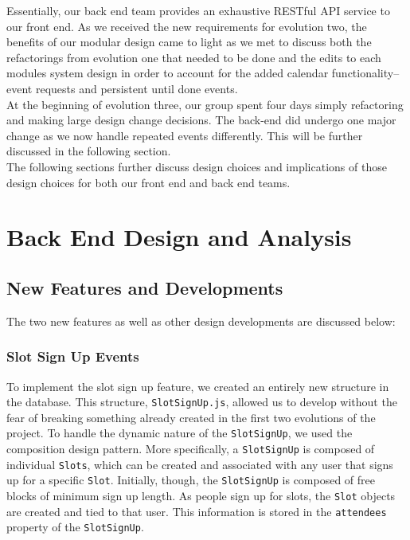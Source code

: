 \documentclass[11pt]{article}   %
\begin{document}
\noindent Essentially, our back end team provides an exhaustive RESTful API service to our front end. As we received the new requirements for evolution two, the benefits of our modular design came to light as we met to discuss both the refactorings from evolution one that needed to be done and the edits to each modules system design in order to account for the added calendar functionality--event requests and persistent until done events.\\

\noindent At the beginning of evolution three, our group spent four days simply refactoring and making large design change decisions. The back-end did undergo one major change as we now handle repeated events differently. This will be further discussed in the following section.\\

\noindent The following sections further discuss design choices and implications of those design choices for both our front end and back end teams. \\

\section{Back End Design and Analysis}
\subsection{New Features and Developments}
The two new features as well as other design developments are discussed below:
\subsubsection{Slot Sign Up Events}
To implement the slot sign up feature, we created an entirely new structure in the database. This structure, \texttt{SlotSignUp.js}, allowed us to develop without the fear of breaking something already created in the first two evolutions of the project. To handle the dynamic nature of the \texttt{SlotSignUp}, we used the composition design pattern. More specifically, a \texttt{SlotSignUp} is composed of individual \texttt{Slots}, which can be created and associated with any user that signs up for a specific \texttt{Slot}. Initially, though, the \texttt{SlotSignUp} is composed of free blocks of minimum sign up length. As people sign up for slots, the \texttt{Slot} objects are created and tied to that user. This information is stored in the \texttt{attendees} property of the \texttt{SlotSignUp}. \\
\end{document}
